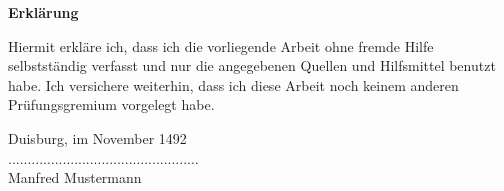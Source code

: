 \begin{center}
\Large{\textsf{\textbf{Erklärung}}}
\end{center}
\vspace{0.8cm}
Hiermit erkläre ich, dass ich die vorliegende Arbeit ohne fremde Hilfe selbstständig
verfasst und nur die angegebenen Quellen und Hilfsmittel benutzt habe. Ich versichere
weiterhin, dass ich diese Arbeit noch keinem anderen Prüfungsgremium vorgelegt habe.

Duisburg, im November 1492
\\[1cm]
.................................................\\[0.2cm]
Manfred Mustermann